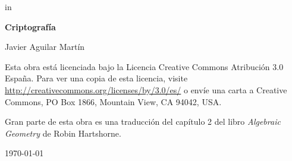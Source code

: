 \documentclass[twoside, 11pt]{report}
\begin{document}
 in

\thispagestyle{empty}

\begin{titlepage}
	\centering
	{\huge\bfseries Criptografía \par}
	\vspace{2cm}
	{\Large Javier Aguilar Martín\par}
	\vspace{2.5cm}
	\vfill
	Esta obra está licenciada bajo la Licencia Creative Commons Atribución 3.0 España. Para ver una copia de esta licencia, visite \url{http://creativecommons.org/licenses/by/3.0/es/} o envíe una carta a Creative Commons, PO Box 1866, Mountain View, CA 94042, USA.

Gran parte de esta obra es una traducción del capítulo 2 del libro \emph{Algebraic Geometry} de Robin Hartshorne.

	{\large \today\par}
\end{titlepage}
	


\begin{center}
\end{center}



\setcounter{page}{0}

\tableofcontents






%
%
%
%
%
%

\end{document}
